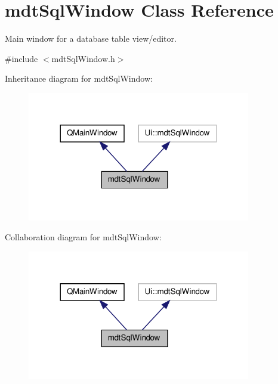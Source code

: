\hypertarget{classmdt_sql_window}{\section{mdt\-Sql\-Window Class Reference}
\label{classmdt_sql_window}
}


Main window for a database table view/editor.  




{\ttfamily \#include $<$mdt\-Sql\-Window.\-h$>$}



Inheritance diagram for mdt\-Sql\-Window\-:\nopagebreak
\begin{figure}[H]
\begin{center}
\leavevmode
\includegraphics[width=276pt]{classmdt_sql_window__inherit__graph}
\end{center}
\end{figure}


Collaboration diagram for mdt\-Sql\-Window\-:\nopagebreak
\begin{figure}[H]
\begin{center}
\leavevmode
\includegraphics[width=276pt]{classmdt_sql_window__coll__graph}
\end{center}
\end{figure}
